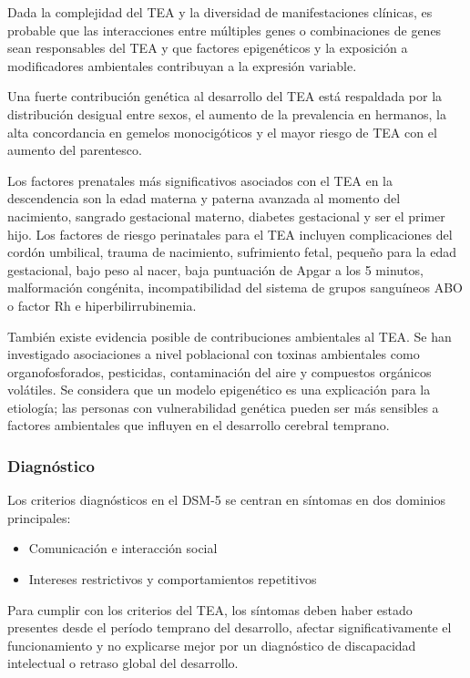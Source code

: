 \documentclass[11pt,letterpaper]{report}
\begin{document}
Dada la complejidad del TEA y la diversidad de manifestaciones clínicas, es
probable que las interacciones entre múltiples genes o combinaciones de genes
sean responsables del TEA y que factores epigenéticos y la exposición a
modificadores ambientales contribuyan a la expresión variable.
\cite{AutismUpToDate}

Una fuerte contribución genética al desarrollo del TEA está respaldada por la
distribución desigual entre sexos, el aumento de la prevalencia en hermanos,
la alta concordancia en gemelos monocigóticos y el mayor riesgo de TEA con el
aumento del parentesco. \cite{AutismUpToDate}

Los factores prenatales más significativos asociados con el TEA en la
descendencia son la edad materna y paterna avanzada al momento del nacimiento,
sangrado gestacional materno, diabetes gestacional y ser el primer hijo. Los
factores de riesgo perinatales para el TEA incluyen complicaciones del cordón
umbilical, trauma de nacimiento, sufrimiento fetal, pequeño para la edad
gestacional, bajo peso al nacer, baja puntuación de Apgar a los 5 minutos,
malformación congénita, incompatibilidad del sistema de grupos sanguíneos ABO
o factor Rh e hiperbilirrubinemia. \cite{Boland2021-by}

También existe evidencia posible de contribuciones ambientales al TEA. Se han
investigado asociaciones a nivel poblacional con toxinas ambientales como
organofosforados, pesticidas, contaminación del aire y compuestos orgánicos
volátiles. Se considera que un modelo epigenético es una explicación para la
etiología; las personas con vulnerabilidad genética pueden ser más sensibles a
factores ambientales que influyen en el desarrollo cerebral temprano.
\cite{Nelson58}

\subsubsection{Diagnóstico}
Los criterios diagnósticos en el DSM-5 se centran en síntomas en dos dominios 
principales:
    \begin{itemize}
        \item Comunicación e interacción social
        \item Intereses restrictivos y comportamientos repetitivos
    \end{itemize}
Para cumplir con los criterios del TEA, los síntomas deben haber estado
presentes desde el período temprano del desarrollo, afectar significativamente
el funcionamiento y no explicarse mejor por un diagnóstico de discapacidad
intelectual o retraso global del desarrollo. \cite{DSM5TR}
\end{document}
